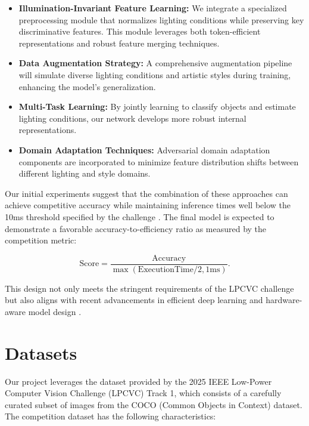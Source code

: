 \documentclass[11pt, oneside]{article}   	%
\begin{document}
\begin{itemize}
	\item \textbf{Illumination-Invariant Feature Learning:} We integrate a specialized preprocessing module that normalizes lighting conditions while preserving key discriminative features. This module leverages both token-efficient representations and robust feature merging techniques.
	
	\item \textbf{Data Augmentation Strategy:} A comprehensive augmentation pipeline will simulate diverse lighting conditions and artistic styles during training, enhancing the model’s generalization.
	
	\item \textbf{Multi-Task Learning:} By jointly learning to classify objects and estimate lighting conditions, our network develops more robust internal representations.
	
	\item \textbf{Domain Adaptation Techniques:} Adversarial domain adaptation components are incorporated to minimize feature distribution shifts between different lighting and style domains.
\end{itemize}

Our initial experiments suggest that the combination of these approaches can achieve competitive accuracy while maintaining inference times well below the 10ms threshold specified by the challenge \cite{chen20242023lowpowercomputervision}. The final model is expected to demonstrate a favorable accuracy-to-efficiency ratio as measured by the competition metric:

\begin{equation}
\label{eq:finalScore}
	\text{Score} = \frac{\text{Accuracy}}{\max(\text{ExecutionTime}/2, 1\text{ms})}. 
\end{equation}


This design not only meets the stringent requirements of the LPCVC challenge but also aligns with recent advancements in efficient deep learning and hardware-aware model design \cite{deepseekai2025deepseekv3technicalreport}.




\section*{Datasets}

Our project leverages the dataset provided by the 2025 IEEE Low-Power Computer Vision Challenge (LPCVC) Track 1, which consists of a carefully curated subset of images from the COCO (Common Objects in Context) dataset. The competition dataset has the following characteristics:
\end{document}
